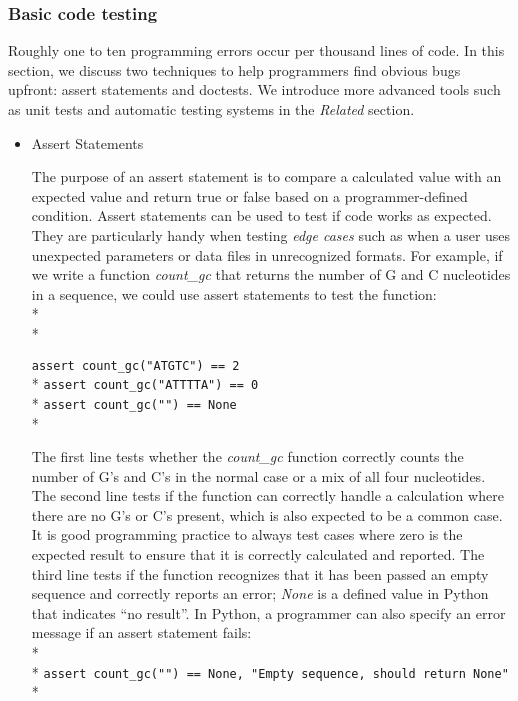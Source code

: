 \documentclass[ChapterTOCs,krantz2]{krantz} %
\begin{document}
\subsubsection{Basic code testing}

Roughly one to ten programming errors occur 
per thousand lines of code\cite{Boehm2005,Ince2012}.  
In this section, we discuss two techniques to help
programmers find obvious bugs upfront: 
assert statements and doctests. We introduce more advanced
tools such as unit tests and automatic testing systems in the \emph{Related}
section.

\begin{itemize}
\item Assert Statements

The purpose of an assert statement is to compare
a calculated value with an expected value and return true or false
based on a programmer-defined condition. Assert statements can be used to
test if code works as expected.  They are
particularly handy when testing \emph{edge cases} such as when a user
uses unexpected parameters or data files in unrecognized formats.
For example, if we write a function \emph{count\_gc} that returns the number of
G and C nucleotides in a sequence, we could use assert statements to test the
function:\\* \\*

\texttt{assert count\_gc("ATGTC") == 2}\\*
\texttt{assert count\_gc("ATTTTA") == 0}\\*
\texttt{assert count\_gc("") == None}\\*

The first line tests whether the \emph{count\_gc} function correctly counts the number
of G's and C's in the normal case or a mix of all four nucleotides.  The second
line tests if the function can correctly handle a calculation where there are
no G's or C's present, which is also expected to be a common case.  It is good
programming practice to always test cases where zero is the expected result to
ensure that it is correctly calculated and reported.  The third line tests if
the function recognizes that it has been passed an empty sequence and correctly
reports an error; \emph{None} is a defined value in Python that indicates ``no result''. In
Python, a programmer can also specify an error message if an assert statement
fails:\\* \\*
\texttt{assert count\_gc("") == None, "Empty sequence, should return None"}\\*


\end{itemize}
\end{document}
